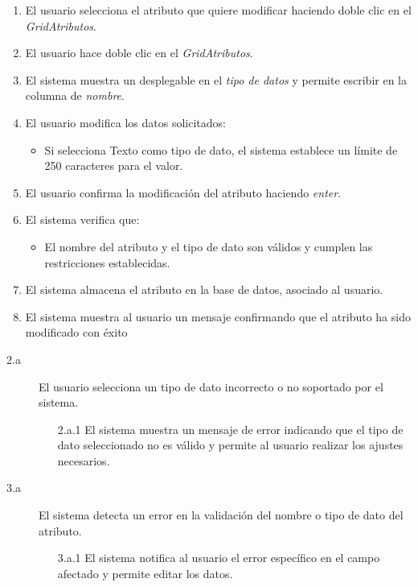 \begin{enumerate}
    \item El usuario selecciona el atributo que quiere modificar haciendo doble clic en el \textit{GridAtributos}.
    \item El usuario hace doble clic en el \textit{GridAtributos}.
    \item El sistema muestra un desplegable en el \textit{tipo de datos} y permite escribir en la columna de \textit{nombre}.
    \item El usuario modifica los datos solicitados:
    \begin{itemize}
        \item Si selecciona Texto como tipo de dato, el sistema establece un límite de 250 caracteres para el valor.
    \end{itemize}
    \item El usuario confirma la modificación del atributo haciendo \textit{enter}.
    \item El sistema verifica que:
    \begin{itemize}
        \item El nombre del atributo y el tipo de dato son válidos y cumplen las restricciones establecidas.
    \end{itemize}
    \item El sistema almacena el atributo en la base de datos, asociado al usuario.
    \item El sistema muestra al usuario un mensaje confirmando que el atributo ha sido modificado con éxito
\end{enumerate}

\begin{description}
    \item[2.a] El usuario selecciona un tipo de dato incorrecto o no soportado por el sistema.
    \begin{enumerate}
        \item[2.a.1] El sistema muestra un mensaje de error indicando que el tipo de dato seleccionado no es válido y permite al usuario realizar los ajustes necesarios.
    \end{enumerate}

    \item[3.a] El sistema detecta un error en la validación del nombre o tipo de dato del atributo.
    \begin{enumerate}
        \item[3.a.1] El sistema notifica al usuario el error específico en el campo afectado y permite editar los datos.
    \end{enumerate}
\end{description}


